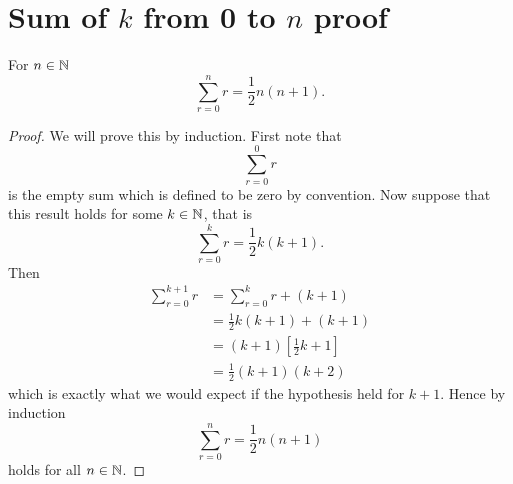 \section{Sum of \texorpdfstring{\(k\)}{k} from 0 to \texorpdfstring{\(n\)}{n} proof}\label{sec:proof sum 0 to n of r is 0.5 n(n+1)}
    \begin{theorem}
        For \(n \in \mathbb{N}\)
        \[\sum_{r=0}^{n} r = \frac{1}{2}n(n + 1).\]
    \end{theorem}
    \begin{proof}
        We will prove this by induction.
        First note that
        \[\sum_{r=0}^{0}r\]
        is the empty sum which is defined to be zero by convention.
        Now suppose that this result holds for some \(k \in \mathbb{N}\), that is
        \[\sum_{r = 0}^{k} r = \frac{1}{2}k(k + 1).\]
        Then
        \begin{align*}
            \sum_{r = 0}^{k + 1} r &= \sum_{r = 0}^{k} r + (k + 1)\\
            &= \frac{1}{2}k(k + 1) + (k + 1)\\
            &= (k + 1)\left[\frac{1}{2}k + 1\right]\\
            &= \frac{1}{2}(k + 1)(k + 2)
        \end{align*}
        which is exactly what we would expect if the hypothesis held for \(k + 1\).
        Hence by induction
        \[\sum_{r=0}^{n} r = \frac{1}{2}n(n + 1)\]
        holds for all \(n\in\mathbb{N}\).
    \end{proof}
